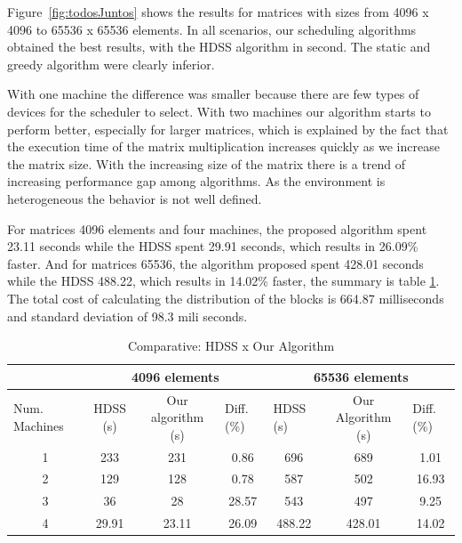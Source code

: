 \documentclass[journal]{IEEEtran}
\begin{document}
Figure~\ref{fig:todosJuntos} shows the results for matrices with sizes from
4096 x 4096 to 65536 x 65536 elements. In all scenarios, our scheduling algorithms
obtained the best results, with the HDSS algorithm in second. The static and
greedy algorithm were clearly inferior.

With one machine the difference was smaller because there are few types of
devices for the scheduler to select. With two machines our algorithm starts to
perform better, especially for larger matrices, which is explained by the fact
that the execution time of the matrix multiplication increases quickly as we
increase the matrix size. With the increasing size of the matrix there is a trend of increasing performance gap among algorithms. As the environment is heterogeneous the behavior is not well defined.

For matrices 4096 elements and four machines, the proposed algorithm spent 23.11 seconds while the HDSS spent 29.91 seconds, which results in 26.09\% faster. And for matrices 65536, the algorithm proposed spent 428.01 seconds while the HDSS 488.22, which results in  14.02\% faster,  the summary is table \ref{table: comparativo}. The total cost of calculating the distribution of the blocks is 664.87 milliseconds and standard deviation of 98.3 mili seconds. 

\begin{table}[htb]
\centering
\caption{Comparative: HDSS x Our Algorithm}

\begin{tabular}{c|c|c|c|c|c|c|}
\cline{2-7}
\multicolumn{1}{l|}{}                 & \multicolumn{3}{c|}{4096 elements}                              & \multicolumn{3}{c|}{65536 elements}                                                  \\ \hline
\multicolumn{1}{|l|}{Num. Machines} & HDSS (s) & Our algorithm (s) & \multicolumn{1}{l|}{Diff. (\%)} & \multicolumn{1}{l|}{HDSS (s)} & Our Algorithm (s) & \multicolumn{1}{l|}{Diff. (\%)} \\ \hline
\multicolumn{1}{|c|}{1 }       & 233     & 231              &   0.86                        
			 & 696                          &   689             &    1.01                        \\ \hline
\multicolumn{1}{|c|}{2 }      & 129     & 128              &    0.78                         
				& 587                         & 502             & 16.93                     \\ \hline
\multicolumn{1}{|c|}{3 }      & 36     & 28              & 28.57                            
			&          543                &    497           &      9.25                          \\ \hline
\multicolumn{1}{|c|}{4 }      & 29.91     & 23.11            & 26.09                       
			    & 488.22                          & 428.01              &     14.02            \\ \hline
\end{tabular}
\label{table: comparativo}
\end{table}
\end{document}
